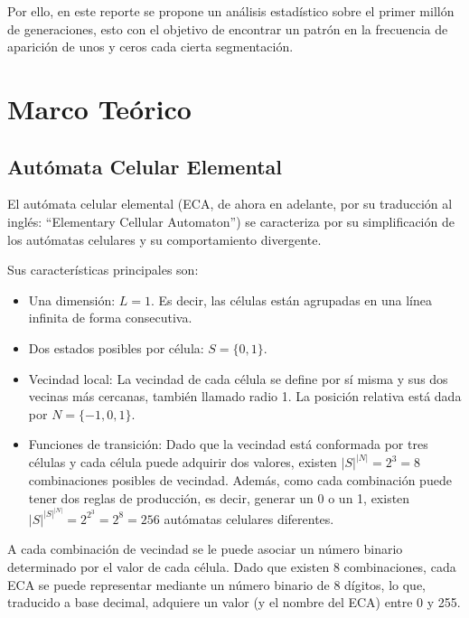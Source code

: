 \documentclass[12pt,twoside]{article}
\begin{document}
	Por ello, en este reporte se propone un análisis estadístico sobre el primer millón de generaciones, esto con el objetivo de encontrar un patrón en la frecuencia de aparición de unos y ceros cada cierta segmentación.
	
	\clearpage
	\section{Marco Teórico}
		
	\subsection{Autómata Celular Elemental}
	
	El autómata celular elemental (ECA, de ahora en adelante, por su traducción al inglés: ``Elementary Cellular Automaton'') se caracteriza por su simplificación de los autómatas celulares y su comportamiento divergente.
	
	Sus características principales son:
	\begin{itemize}
		\item Una dimensión: $L = 1$. Es decir, las células están agrupadas en una línea infinita de forma consecutiva.
		
		\item Dos estados posibles por célula: $S = \{0, 1\}$.  
		
		\item Vecindad local: La vecindad de cada célula se define por sí misma y sus dos vecinas más cercanas, también llamado radio 1. La posición relativa está dada por $N = \{-1, 0, 1\}$.  
		
		\item Funciones de transición: Dado que la vecindad está conformada por tres células y cada célula puede adquirir dos valores, existen $|S|^{|N|} = 2^3 = 8$ combinaciones posibles de vecindad. Además, como cada combinación puede tener dos reglas de producción, es decir, generar un 0 o un 1, existen $|S|^{|S|^{|N|}} = 2^{2^3} = 2^8 = 256$ autómatas celulares diferentes.  
		
	\end{itemize}
	
	A cada combinación de vecindad se le puede asociar un número binario determinado por el valor de cada célula. Dado que existen 8 combinaciones, cada ECA se puede representar mediante un número binario de 8 dígitos, lo que, traducido a base decimal, adquiere un valor (y el nombre del ECA) entre 0 y 255.
	
\end{document}
